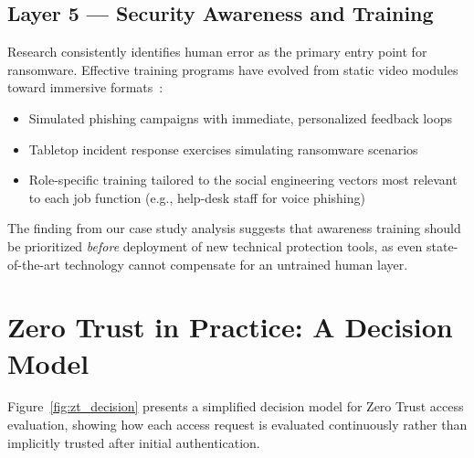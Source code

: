 \documentclass[sigconf,nonacm]{acmart}
\begin{document}
\subsection{Layer 5 — Security Awareness and Training}

Research consistently identifies human error as the primary entry point for ransomware.
Effective training programs have evolved from static video modules toward immersive
formats~\cite{kontio2016}:
\begin{itemize}
  \item Simulated phishing campaigns with immediate, personalized feedback loops
  \item Tabletop incident response exercises simulating ransomware scenarios
  \item Role-specific training tailored to the social engineering vectors most relevant
        to each job function (e.g., help-desk staff for voice phishing)
\end{itemize}

The finding from our case study analysis suggests that awareness training should be
prioritized \emph{before} deployment of new technical protection tools, as even
state-of-the-art technology cannot compensate for an untrained human layer.

\section{Zero Trust in Practice: A Decision Model}

Figure~\ref{fig:zt_decision} presents a simplified decision model for Zero Trust access
evaluation, showing how each access request is evaluated continuously rather than
implicitly trusted after initial authentication.
\end{document}

